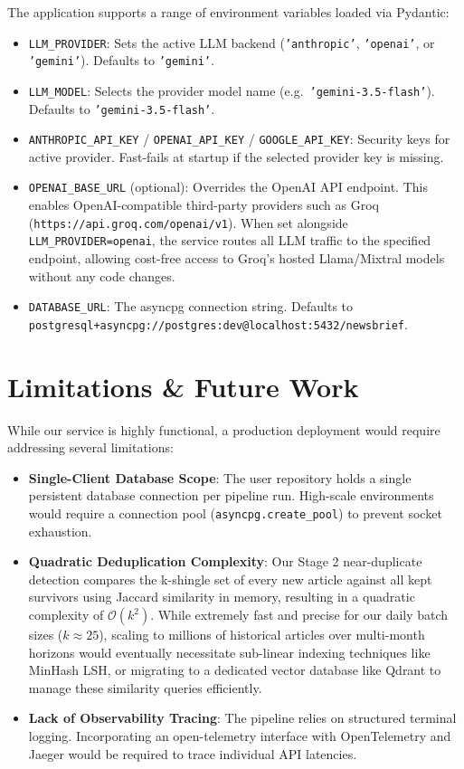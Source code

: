 \documentclass[11pt,a4paper]{article}
\begin{document}
The application supports a range of environment variables loaded via Pydantic:
\begin{itemize}
    \item \texttt{LLM\_PROVIDER}: Sets the active LLM backend (\texttt{'anthropic'}, \texttt{'openai'}, or \texttt{'gemini'}). Defaults to \texttt{'gemini'}.
    \item \texttt{LLM\_MODEL}: Selects the provider model name (e.g.\ \texttt{'gemini-3.5-flash'}). Defaults to \texttt{'gemini-3.5-flash'}.
    \item \texttt{ANTHROPIC\_API\_KEY} / \texttt{OPENAI\_API\_KEY} / \texttt{GOOGLE\_API\_KEY}: Security keys for active provider. Fast-fails at startup if the selected provider key is missing.
    \item \texttt{OPENAI\_BASE\_URL} (optional): Overrides the OpenAI API endpoint. This enables OpenAI-compatible third-party providers such as Groq (\texttt{https://api.groq.com/openai/v1}). When set alongside \texttt{LLM\_PROVIDER=openai}, the service routes all LLM traffic to the specified endpoint, allowing cost-free access to Groq's hosted Llama/Mixtral models without any code changes.
    \item \texttt{DATABASE\_URL}: The asyncpg connection string. Defaults to \texttt{postgresql+asyncpg://postgres:dev@localhost:5432/newsbrief}.
\end{itemize}

\section{Limitations \& Future Work}\label{sec:limits}

While our service is highly functional, a production deployment would require addressing several limitations:
\begin{itemize}
    \item \textbf{Single-Client Database Scope}: The user repository holds a single persistent database connection per pipeline run. High-scale environments would require a connection pool (\texttt{asyncpg.create\_pool}) to prevent socket exhaustion.
    \item \textbf{Quadratic Deduplication Complexity}: Our Stage 2 near-duplicate detection compares the k-shingle set of every new article against all kept survivors using Jaccard similarity in memory, resulting in a quadratic complexity of $\mathcal{O}(k^2)$. While extremely fast and precise for our daily batch sizes ($k \approx 25$), scaling to millions of historical articles over multi-month horizons would eventually necessitate sub-linear indexing techniques like MinHash LSH, or migrating to a dedicated vector database like Qdrant to manage these similarity queries efficiently.
    \item \textbf{Lack of Observability Tracing}: The pipeline relies on structured terminal logging. Incorporating an open-telemetry interface with OpenTelemetry and Jaeger would be required to trace individual API latencies.
\end{itemize}
\end{document}
